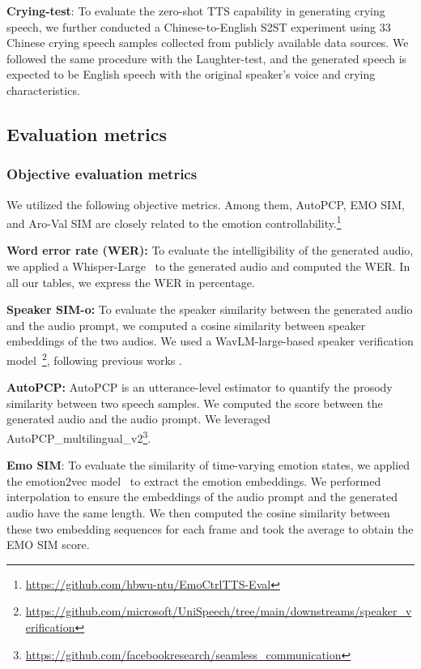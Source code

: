 \textbf{Crying-test}: 
To
evaluate the zero-shot TTS capability in generating crying speech, 
we further conducted a Chinese-to-English S2ST experiment
using 33 Chinese crying speech samples collected from publicly available data sources.
We followed the same procedure with the Laughter-test,
and the generated speech is expected to be English speech with the original speaker's voice and crying characteristics. 


\vspace{-.5em}
\subsection{Evaluation metrics}
\vspace{-.5em}

\subsubsection{Objective evaluation metrics}
\vspace{-.5em}

We utilized the following objective metrics. Among them, AutoPCP, EMO SIM, and Aro-Val SIM are closely related to the emotion controllability.\footnote{\textcolor{black}{\url{https://github.com/hbwu-ntu/EmoCtrlTTS-Eval}}}

\textbf{Word error rate (WER):} To evaluate the intelligibility of the generated audio, 
we applied a Whisper-Large~\cite{radford2023robust} to the generated audio and computed the WER. 
In all our tables, we express the WER in percentage.

\textbf{Speaker SIM-o:} To evaluate the speaker similarity between the generated audio and the audio prompt, we computed a cosine similarity between speaker embeddings of the two audios. We used a WavLM-large-based 
speaker verification model~\cite{chen2022wavlm}\footnote{\url{https://github.com/microsoft/UniSpeech/tree/main/downstreams/speaker\_verification}}, following previous works \cite{wang2023neural,le2024voicebox}.

\textbf{AutoPCP:} AutoPCP \cite{barrault2023seamless} is an utterance-level estimator to quantify the prosody similarity between two speech samples.
We computed the score between the generated audio and the audio prompt.
We leveraged AutoPCP\_multilingual\_v2\footnote{\url{https://github.com/facebookresearch/seamless\_communication}}.

\textbf{Emo SIM}: To evaluate the similarity of time-varying emotion states, we applied the emotion2vec model~\cite{ma2023emotion2vec} to extract the emotion embeddings. 
We performed interpolation to ensure the embeddings of the audio prompt and the generated audio have the same length. We then computed the cosine similarity between these two embedding sequences for each frame and took the average to obtain the EMO SIM score.
 
